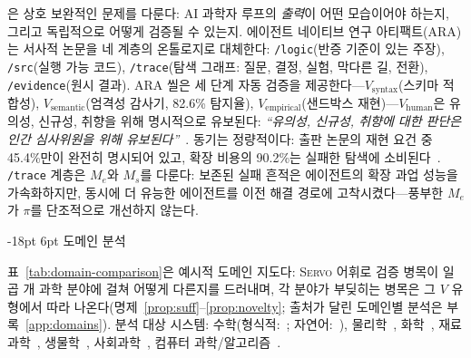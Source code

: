 \documentclass[11pt]{article}
\makeatletter
\renewcommand\section{\@startsection{section}{1}{\z@}%
  {-18pt \@plus -4pt \@minus -2pt}%
  {6pt \@plus 2pt}%
  {\normalfont\large\bfseries}}
\newcommand{\framework}{\textsc{Servo}}
\makeatother
\begin{document}
\citet{liu2026lasthuman}은 상호 보완적인 문제를 다룬다: AI 과학자 루프의 \emph{출력}이 어떤 모습이어야 하는지, 그리고 독립적으로 어떻게 검증될 수 있는지. 에이전트 네이티브 연구 아티팩트(ARA)는 서사적 논문을 네 계층의 온톨로지로 대체한다: \texttt{/logic}(반증 기준이 있는 주장), \texttt{/src}(실행 가능 코드), \texttt{/trace}(탐색 그래프: 질문, 결정, 실험, 막다른 길, 전환), \texttt{/evidence}(원시 결과). ARA 씰은 세 단계 자동 검증을 제공한다---$V_\text{syntax}$(스키마 적합성), $V_\text{semantic}$(엄격성 감사기, 82.6\% 탐지율), $V_\text{empirical}$(샌드박스 재현)---$V_\text{human}$은 유의성, 신규성, 취향을 위해 명시적으로 유보된다: \textit{``유의성, 신규성, 취향에 대한 판단은 인간 심사위원을 위해 유보된다''}~\citep{liu2026lasthuman}. 동기는 정량적이다: 출판 논문의 재현 요건 중 45.4\%만이 완전히 명시되어 있고, 확장 비용의 90.2\%는 실패한 탐색에 소비된다~\citep{liu2026lasthuman}. \texttt{/trace} 계층은 $M_e$와 $M_s$를 다룬다: 보존된 실패 흔적은 에이전트의 확장 과업 성능을 가속화하지만, 동시에 더 유능한 에이전트를 이전 해결 경로에 고착시켰다---풍부한 $M_e$가 $\pi$를 단조적으로 개선하지 않는다.

\section{도메인 분석}
\label{sec:domains}

표~\ref{tab:domain-comparison}은 예시적 도메인 지도다: \framework{} 어휘로 검증 병목이 일곱 개 과학 분야에 걸쳐 어떻게 다른지를 드러내며, 각 분야가 부딪히는 병목은 그 $V$ 유형에서 따라 나온다(명제~\ref{prop:suff}--\ref{prop:novelty}; 출처가 달린 도메인별 분석은 부록~\ref{app:domains}). 분석 대상 시스템: 수학(형식적:~\citep{romera2023funsearch,xin2024deepseek}; 자연어:~\citep{google2026aletheia}), 물리학~\citep{udrescu2020afeynman,cranmer2020symbolic}, 화학~\citep{bran2023chemcrow,sprueill2024chemreasoner,kamber2026chemist}, 재료과학~\citep{merchant2023gnome}, 생물학~\citep{odonoghue2023bioplanner}, 사회과학~\citep{manning2024automated,aher2023turing,park2023generative}, 컴퓨터 과학/알고리즘~\citep{real2020automlzero,surina2025algodiscovery,jaber2026autokernel}.
\end{document}
